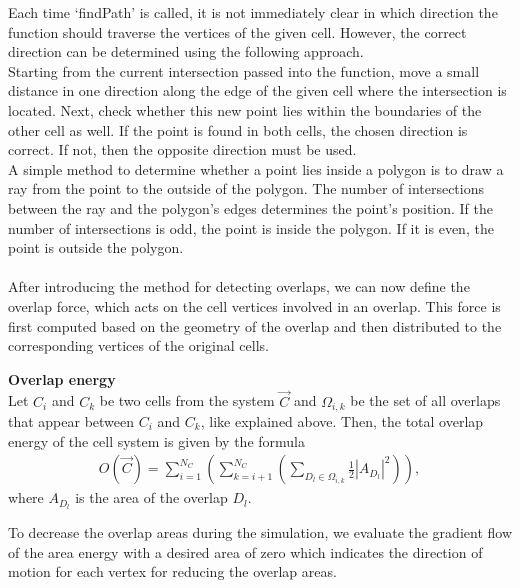 Each time `findPath' is called, it is not immediately clear in which direction the function should traverse the vertices of the given cell. 
However, the correct direction can be determined using the following approach. \\
Starting from the current intersection passed into the function, move a small distance in one direction along the edge of the given cell where the intersection is located. Next, check whether this new point lies within the boundaries of the other cell as well. 
If the point is found in both cells, the chosen direction is correct. 
If not, then the opposite direction must be used. \\ 
A simple method to determine whether a point lies inside a polygon is to draw a ray from the point to the outside of the polygon. 
The number of intersections between the ray and the polygon's edges determines the point's position. 
If the number of intersections is odd, the point is inside the polygon.
If it is even, the point is outside the polygon. \\ 
\smallskip  \\
After introducing the method for detecting overlaps, we can now define the overlap force, which acts on the cell vertices involved in an overlap. 
This force is first computed based on the geometry of the overlap and then distributed to the corresponding vertices of the original cells. 

\begin{definition} \textbf{Overlap energy} \\
	Let $C_i$ and $C_k$ be two cells from the system $\vec{C}$ and $\Omega_{i,k}$ be the set of all overlaps that appear between $C_i$ and $C_k$, like explained above. Then, the total overlap energy of the cell system is given by the formula 
	\begin{align}
		O(\vec{C}) = \sum\limits_{i=1}^{N_C} \left( \sum\limits_{k=i+1}^{N_C} (\sum\limits_{D_l \in \Omega_{i,k}} \frac{1}{2}|A_{D_l}|^2) \right),		
	\end{align} 
	where $A_{D_l}$ is the area of the overlap $D_l$.  \\
\end{definition}

To decrease the overlap areas during the simulation, we evaluate the gradient flow of the area energy with a desired area of zero which indicates the direction of motion for each vertex for reducing the overlap areas.

